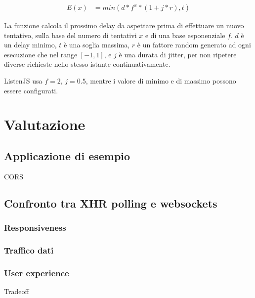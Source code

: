 \documentclass[12pt,a4paper,openright,twoside]{report}
\begin{document}
\begin{align*}
  E(x) &= min(d * f^x * (1 + j * r), t)
\end{align*}

La funzione calcola il prossimo delay da aspettare prima di effettuare un nuovo tentativo, sulla base del numero di tentativi $x$ e di una base esponenziale $f$. $d$ è un delay minimo, $t$ è una soglia massima, $r$ è un fattore random generato ad ogni esecuzione che nel range $[-1, 1]$, e $j$ è una durata di jitter, per non ripetere diverse richieste nello stesso istante continuativamente.

ListenJS usa $f=2$, $j=0.5$, mentre i valore di minimo e di massimo possono essere configurati.

\chapter{Valutazione}
\section{Applicazione di esempio}\label{sec_applicazioneesempio}
CORS

\section{Confronto tra XHR polling e websockets}\label{sec_confrontopollingwebsockets}

\subsection{Responsiveness}

\subsection{Traffico dati}

\subsection{User experience}
Tradeoff

\end{document}
